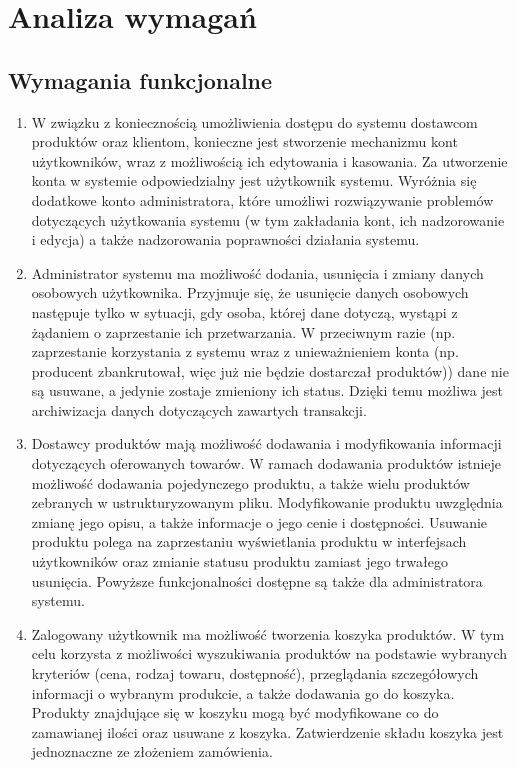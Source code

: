 \documentclass[11pt,a4paper,twoside]{article}
\begin{document}
\section{Analiza wymagań}
\subsection{Wymagania funkcjonalne}
\begin{enumerate}[start=1,label={WF\arabic*.}]
\item W związku z koniecznością umożliwienia dostępu do systemu dostawcom produktów oraz klientom, konieczne jest stworzenie mechanizmu kont użytkowników, wraz z możliwością ich edytowania i kasowania. Za utworzenie konta w systemie odpowiedzialny jest użytkownik systemu. Wyróżnia się dodatkowe konto administratora, które umożliwi rozwiązywanie problemów dotyczących użytkowania systemu (w tym zakładania kont, ich nadzorowanie i edycja) a także nadzorowania poprawności działania systemu.
\item Administrator systemu ma możliwość dodania, usunięcia i zmiany danych osobowych użytkownika. Przyjmuje się, że usunięcie danych osobowych następuje tylko w sytuacji, gdy osoba, której dane dotyczą, wystąpi z żądaniem o zaprzestanie ich przetwarzania. W przeciwnym razie (np. zaprzestanie korzystania z systemu wraz z unieważnieniem konta (np. producent zbankrutował, więc już nie będzie dostarczał produktów)) dane nie są usuwane, a jedynie zostaje zmieniony ich status. Dzięki temu możliwa jest archiwizacja danych dotyczących zawartych transakcji.
\item Dostawcy produktów mają możliwość dodawania i modyfikowania informacji dotyczących oferowanych towarów. W ramach dodawania produktów istnieje możliwość dodawania pojedynczego produktu, a także wielu produktów zebranych w ustrukturyzowanym pliku. Modyfikowanie produktu uwzględnia  zmianę jego opisu, a także informacje o jego cenie i dostępności. Usuwanie produktu polega na zaprzestaniu wyświetlania produktu w interfejsach użytkowników oraz zmianie statusu produktu zamiast jego trwałego usunięcia. Powyższe funkcjonalności dostępne są także dla administratora systemu.
\item Zalogowany użytkownik ma możliwość tworzenia koszyka produktów. W tym celu korzysta z możliwości wyszukiwania produktów na podstawie wybranych kryteriów (cena, rodzaj towaru, dostępność), przeglądania szczegółowych informacji o wybranym produkcie, a także dodawania go do koszyka. Produkty znajdujące się w koszyku mogą być modyfikowane co do zamawianej ilości oraz usuwane z koszyka. Zatwierdzenie składu koszyka jest jednoznaczne ze złożeniem zamówienia.

\end{enumerate}
\end{document}
